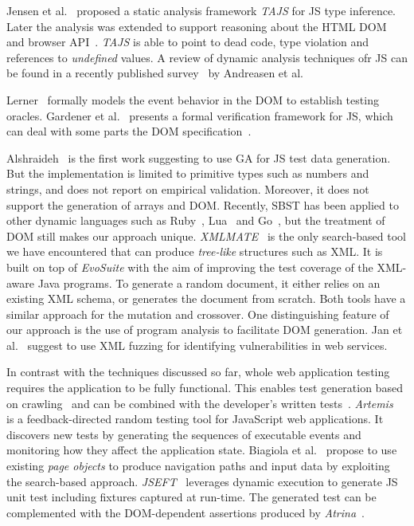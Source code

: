 
Jensen et al.~\cite{tajs2009} proposed a static analysis framework \emph{TAJS} for JS type inference. Later the analysis was extended to support reasoning about the HTML DOM and browser API~\cite{dom2011}. \emph{TAJS} is able to point to dead code, type violation and references to \emph{undefined} values. A review of dynamic analysis techniques ofr JS can be found in a recently published survey~\cite{andreasen2017survey} by Andreasen et al.

Lerner~\cite{lerner2012modeling} formally models the event behavior in the DOM to establish testing oracles. Gardener et al.~\cite{gardner2012towards} presents a formal verification framework for JS, which can deal with some parts the DOM specification~\cite{gardner2008local}.

Alshraideh~\cite{alshraideh2008complete} is the first work suggesting to use GA for JS test data generation. But the implementation is limited to primitive types such as numbers and strings, and does not report on empirical validation. Moreover, it does not support the generation of arrays and DOM. Recently, SBST has been applied to other dynamic languages such as Ruby~\cite{mairhofer2011search}, Lua~\cite{wibowo2015unit} and Go~\cite{irawan2016test}, but the treatment of DOM still makes our approach unique. \emph{XMLMATE}~\cite{havrikov2014xmlmate} is the only search-based tool we have encountered that can produce \emph{tree-like} structures such as XML. It is built on top of \emph{EvoSuite} with the aim of improving the test coverage of the XML-aware Java programs. To generate a random document, it either relies on an existing XML schema, or generates the document from scratch. Both tools have a similar approach for the mutation and crossover. One distinguishing feature of our approach is the use of program analysis to facilitate DOM generation. Jan et al.~\cite{jan2016automated} suggest to use XML fuzzing for identifying vulnerabilities in web services.

In contrast with the techniques discussed so far, whole web application testing requires the application to be fully functional. This enables test generation based on crawling~\cite{mesbah2012invariant} and can be combined with the developer's written tests~\cite{milani2014leveraging}. \emph{Artemis}~\cite{artemis2011} is a feedback-directed random testing tool for JavaScript web applications. It discovers new tests by generating the sequences of executable events and monitoring how they affect the application state. Biagiola et al.~\cite{biagiola2017search} propose to use existing \emph{page objects} to produce navigation paths and input data by exploiting the search-based approach. \emph{JSEFT}~\cite{mirshokraie2015jseft} leverages dynamic execution to generate JS unit test including fixtures captured at run-time. The generated test can be complemented with the DOM-dependent assertions produced by \emph{Atrina}~\cite{icst16}.

